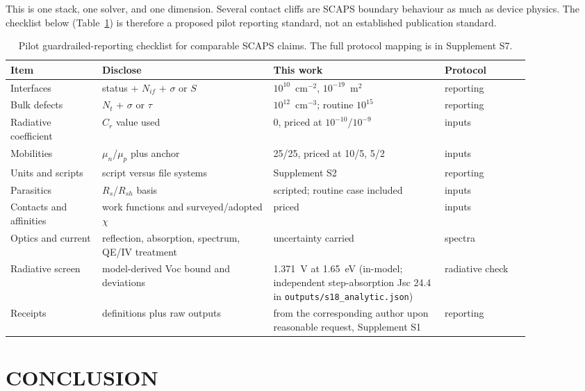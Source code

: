 \documentclass[11pt,a4paper]{article}
\begin{document}
This is one stack, one solver, and one dimension. Several contact cliffs are SCAPS boundary behaviour as much as device physics. The checklist below (Table~\ref{tab:checklist}) is therefore a proposed pilot reporting standard, not an established publication standard.

\begin{table}[tbp]
\centering
\caption{Pilot guardrailed-reporting checklist for comparable SCAPS claims. The full protocol mapping is in Supplement S7.}
\label{tab:checklist}
\small
\begingroup
\setlength{\tabcolsep}{3pt}
\begin{tabular}{|p{0.15\linewidth}|p{0.29\linewidth}|p{0.29\linewidth}|p{0.14\linewidth}|}
\hline\hline
Item & Disclose & This work & Protocol \\
\hline
Interfaces & status + $N_{if}$ + $\sigma$ or $S$ & $10^{10}$~cm$^{-2}$, $10^{-19}$~m$^2$ & reporting \\
Bulk defects & $N_t$ + $\sigma$ or $\tau$ & $10^{12}$~cm$^{-3}$; routine $10^{15}$ & reporting \\
Radiative coefficient & $C_r$ value used & $0$, priced at $10^{-10}$/$10^{-9}$ & inputs \\
Mobilities & $\mu_n$/$\mu_p$ plus anchor & 25/25, priced at 10/5, 5/2 & inputs \\
Units and scripts & script versus file systems & Supplement S2 & reporting \\
Parasitics & $R_s$/$R_{sh}$ basis & scripted; routine case included & inputs \\
Contacts and affinities & work functions and surveyed/adopted $\chi$ & priced & inputs \\
Optics and current & reflection, absorption, spectrum, QE/IV treatment & uncertainty carried & spectra \\
Radiative screen & model-derived Voc bound and deviations & 1.371~V at 1.65~eV (in-model; independent step-absorption Jsc 24.4 in \texttt{outputs/s18\_analytic.json}) & radiative check \\
Receipts & definitions plus raw outputs & from the corresponding author upon reasonable request, Supplement S1 & reporting \\
\hline\hline
\end{tabular}
\endgroup
\end{table}

\section{CONCLUSION}
\end{document}
